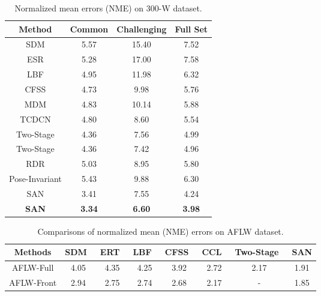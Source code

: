 \documentclass[10pt,twocolumn,letterpaper]{article}
\begin{document}
\begin{table}[t]
\small
\setlength{\tabcolsep}{3.2pt}
\centering
\begin{supertabular}{|c|c|c|c|} \hline
      Method                            & Common & Challenging & Full Set  \\\hline
      SDM \cite{xiong2013supervised}    & 5.57   & 15.40       & 7.52      \\
      ESR \cite{cao2014face}            & 5.28   & 17.00       & 7.58      \\
      LBF \cite{ren2016face}            & 4.95   & 11.98       & 6.32      \\
      CFSS \cite{zhu2015face}           & 4.73   & 9.98        & 5.76      \\
      MDM \cite{trigeorgis2016mnemonic} & 4.83   & 10.14       & 5.88      \\
      TCDCN \cite{zhang2014facial}      & 4.80   & 8.60        & 5.54      \\
      Two-Stage \cite{lv2017deep}& 4.36   & 7.56        & 4.99      \\
      Two-Stage \cite{lv2017deep}& 4.36   & 7.42        & 4.96      \\
      RDR \cite{xiao2017recurrent}      & 5.03   & 8.95        & 5.80      \\ 
 Pose-Invariant\cite{jourabloo2017pose} & 5.43   & 9.88        & 6.30      \\\hline
      SAN                        & 3.41   & 7.55        & 4.24      \\
     {\bf SAN}                & {\bf 3.34}& {\bf 6.60}  &{\bf 3.98} \\
\hline
\end{supertabular}
\vspace{2mm}
\caption{Normalized mean errors (NME) on 300-W dataset.
}
\vspace{-3mm}
\label{table:300W-ALL}
\end{table}



\begin{table*}[t]
\small
\setlength{\tabcolsep}{3.2pt}
\centering
\begin{supertabular}{|c|c c c c c c |c|} \hline
Methods   & SDM~\cite{xiong2013supervised} & ERT~\cite{kazemi2014one} & LBF~\cite{ren2016face} & CFSS~\cite{zhu2015face} & CCL~\cite{zhu2016unconstrained} & Two-Stage~\cite{lv2017deep} & SAN     \\ \hline
AFLW-Full & 4.05                           & 4.35                     & 4.25                   & 3.92                    & 2.72                       & 2.17                        & 1.91    \\ \hline
AFLW-Front& 2.94                           & 2.75                     & 2.74                   & 2.68                    & 2.17                       &  -                          & 1.85    \\\hline
\end{supertabular}
\vspace{2mm}
\caption{Comparisons of normalized mean (NME) errors on AFLW dataset.
}
\vspace{-2mm}
\label{table:aflw}
\end{table*}
\end{document}
